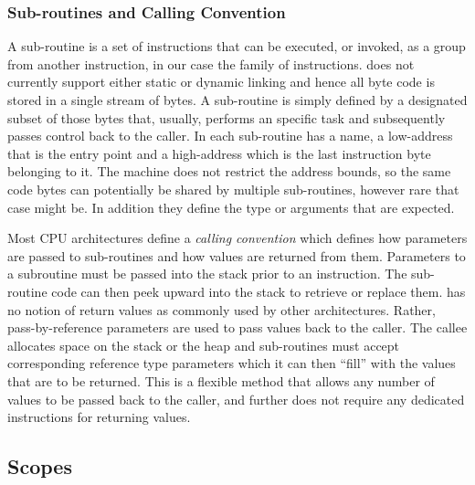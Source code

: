 \subsubsection{Sub-routines and Calling Convention}

A sub-routine is a set of instructions that can be executed, or invoked, as a
group from another instruction, in our case the  family of
instructions. \thename{} does not currently support either static or dynamic
linking and hence all byte code is stored in a single stream of bytes. A
sub-routine is simply defined by a designated subset of those bytes that,
usually, performs an specific task and subsequently passes control back to the
caller. In \thename{} each sub-routine has a name, a low-address that is the
entry point and a high-address which is the last instruction byte belonging to
it. The machine does not restrict the address bounds, so the same code bytes can
potentially be shared by multiple sub-routines, however rare that case might
be. In addition they define the type or arguments that are expected.

Most CPU architectures define a \emph{calling convention} which defines how
parameters are passed to sub-routines and how values are returned from
them. Parameters to a subroutine must be passed into the stack prior to an
 instruction. The sub-routine code can then peek upward into the
stack to retrieve or replace them. \thename{} has no notion of return values as
commonly used by other architectures. Rather, pass-by-reference parameters are
used to pass values back to the caller. The callee allocates space on the stack
or the heap and sub-routines must accept corresponding reference type parameters
which it can then ``fill'' with the values that are to be returned. This is a
flexible method that allows any number of values to be passed back to the
caller, and further does not require any dedicated instructions for returning
values.

\subsection{Scopes}

